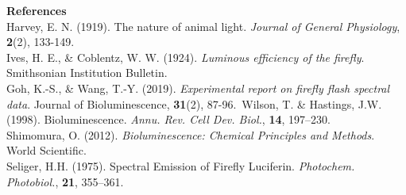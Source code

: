 \begin{technical}
\vspace{0.5em}
\noindent\textbf{References}\\
Harvey, E. N. (1919). The nature of animal light. \textit{Journal of General Physiology}, \textbf{2}(2), 133-149.\\
Ives, H. E., \& Coblentz, W. W. (1924). \textit{Luminous efficiency of the firefly}. Smithsonian Institution Bulletin.\\
Goh, K.-S., \& Wang, T.-Y. (2019). \textit{Experimental report on firefly flash spectral data}. Journal of Bioluminescence, \textbf{31}(2), 87-96.\
Wilson, T. \& Hastings, J.W. (1998). Bioluminescence. \textit{Annu. Rev. Cell Dev. Biol.}, \textbf{14}, 197--230.\\
Shimomura, O. (2012). \textit{Bioluminescence: Chemical Principles and Methods}. World Scientific.\\
Seliger, H.H. (1975). Spectral Emission of Firefly Luciferin. \textit{Photochem. Photobiol.}, \textbf{21}, 355--361.
\end{technical}